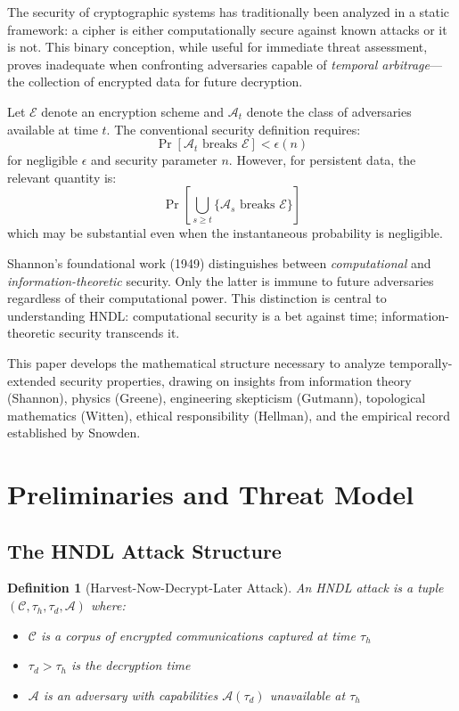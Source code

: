 \documentclass[11pt,a4paper]{article}
\newtheorem{definition}[theorem]{Definition}
\begin{document}
The security of cryptographic systems has traditionally been analyzed in a static framework: a cipher is either computationally secure against known attacks or it is not. This binary conception, while useful for immediate threat assessment, proves inadequate when confronting adversaries capable of \textit{temporal arbitrage}---the collection of encrypted data for future decryption.

Let $\mathcal{E}$ denote an encryption scheme and $\mathcal{A}_t$ denote the class of adversaries available at time $t$. The conventional security definition requires:
\begin{equation}
\Pr[\mathcal{A}_t \text{ breaks } \mathcal{E}] < \epsilon(n)
\end{equation}
for negligible $\epsilon$ and security parameter $n$. However, for persistent data, the relevant quantity is:
\begin{equation}
\Pr\left[\bigcup_{s \geq t} \{\mathcal{A}_s \text{ breaks } \mathcal{E}\}\right]
\end{equation}
which may be substantial even when the instantaneous probability is negligible.

Shannon's foundational work (1949) distinguishes between \textit{computational} and \textit{information-theoretic} security. Only the latter is immune to future adversaries regardless of their computational power. This distinction is central to understanding HNDL: computational security is a bet against time; information-theoretic security transcends it.

This paper develops the mathematical structure necessary to analyze temporally-extended security properties, drawing on insights from information theory (Shannon), physics (Greene), engineering skepticism (Gutmann), topological mathematics (Witten), ethical responsibility (Hellman), and the empirical record established by Snowden.

\section{Preliminaries and Threat Model}

\subsection{The HNDL Attack Structure}

\begin{definition}[Harvest-Now-Decrypt-Later Attack]
An HNDL attack is a tuple $(\mathcal{C}, \tau_h, \tau_d, \mathcal{A})$ where:
\begin{itemize}[noitemsep]
    \item $\mathcal{C}$ is a corpus of encrypted communications captured at time $\tau_h$
    \item $\tau_d > \tau_h$ is the decryption time
    \item $\mathcal{A}$ is an adversary with capabilities $\mathcal{A}(\tau_d)$ unavailable at $\tau_h$
\end{itemize}
\end{definition}
\end{document}
